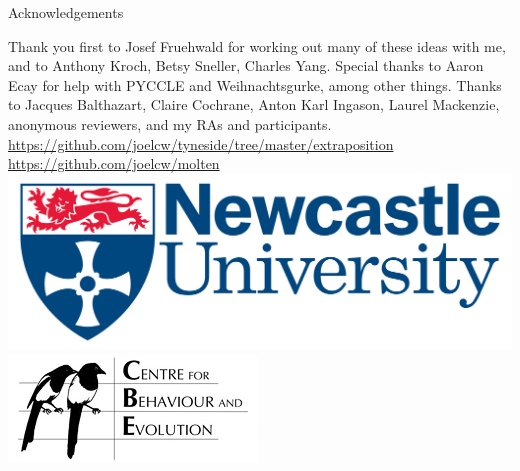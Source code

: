 \documentclass[hyperref={pdfpagelabels=false}]{beamer}
\begin{document}


\begin{frame}{Acknowledgements}
\begin{center}
Thank you first to Josef Fruehwald for working out many of these ideas with me, and to Anthony Kroch, Betsy Sneller, Charles Yang. Special thanks to Aaron Ecay for help with PYCCLE and Weihnachtsgurke, among other things. Thanks to Jacques Balthazart, Claire Cochrane, Anton Karl Ingason, Laurel Mackenzie, anonymous reviewers, and my RAs and participants.
\vspace{5mm}\\
\url{https://github.com/joelcw/tyneside/tree/master/extraposition}\\\url{https://github.com/joelcw/molten}\\\vspace{3mm}
\includegraphics[scale = 0.1]{ncllogo.jpg} \includegraphics[scale = 0.4]{cbelogo.jpg} 
\end{center}
\end{frame}
\end{document}
